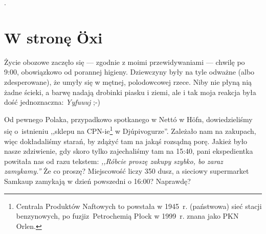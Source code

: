 

.

\section*{W stronę Öxi}

Życie obozowe zaczęło się --- zgodnie z moimi przewidywaniami --- chwilę po 9:00, obowiązkowo od porannej higieny. Dziewczyny były na tyle odważne (albo zdesperowane), że umyły się w mętnej, polodowcowej rzece. Niby nie płyną nią żadne ścieki, a barwę nadają drobinki piasku i ziemi, ale i tak moja reakcja była dość jednoznaczna: \emph{Yy\textellipsis fuuuj\textellipsis} ;-)

Od pewnego Polaka, przypadkowo spotkanego w Nettó w Höfn, dowiedzieliśmy się o~istnieniu ,,sklepu na CPN-ie\footnote{Centrala Produktów Naftowych to powstała w 1945~r. (państwowa) sieć stacji benzynowych, po fuzji\linebreak z~Petrochemią Płock w 1999~r. znana jako PKN Orlen.} w Djúpivogurze''. Zależało nam na zakupach, więc dokładaliśmy starań, by zdążyć tam na jakąś rozsądną porę. Jakież było nasze zdziwienie, gdy skoro tylko zajechaliśmy tam na 15:40, pani ekspedientka powitała nas od razu tekstem: \emph{,,Róbcie proszę zakupy szybko, bo zaraz zamykamy.''} Że co proszę? Miejscowość liczy 350 dusz, a sieciowy supermarket Samkaup zamykają w dzień powszedni o 16:00? Naprawdę?


